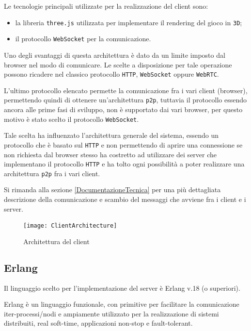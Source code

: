 \documentclass[paper=a4, fontsize=11pt]{scrartcl} %
\numberwithin{equation}{section} %
\numberwithin{figure}{section} %
\numberwithin{table}{section} %
\begin{document}
Le tecnologie principali utilizzate per la realizzazione del client sono:
\begin{itemize}
\item la libreria \texttt{three.js} \cite{threejs} utilizzata per implementare il rendering del gioco in \texttt{3D};
\item il protocollo \texttt{WebSocket} \cite{websocket} per la comunicazione.
\end{itemize}

Uno degli svantaggi di questa architettura è dato da un limite imposto dal browser nel modo di comunicare. Le scelte a disposizione per tale operazione possono ricadere nel classico protocollo \texttt{HTTP}, \texttt{WebSocket} oppure \texttt{WebRTC}.

L'ultimo protocollo elencato permette la comunicazione fra i vari client (browser), permettendo quindi di ottenere un'architettura \texttt{p2p}, tuttavia il
protocollo essendo ancora alle prime fasi di sviluppo, non è supportato dai vari browser, per questo motivo è stato scelto il protocollo \texttt{WebSocket}. 

Tale scelta ha influenzato l'architettura
generale del sistema, essendo un protocollo che è basato sul \texttt{HTTP} e non permettendo di aprire una connessione se non richiesta dal browser stesso ha costretto
ad utilizzare dei server che implementano il protocollo \texttt{HTTP} e ha tolto ogni possibilità a poter realizzare una architettura \texttt{p2p} fra i vari client.

Si rimanda alla sezione \ref{DocumentazioneTecnica} per una più dettagliata descrizione della comunicazione e scambio del messaggi che avviene fra i client e i server.

\begin{figure}
\centering
\texttt{[image: ClientArchitecture]}
\caption{Architettura del client}
\label{ClientArc}
\end{figure}

\subsection{Erlang}
Il linguaggio scelto per l'implementazione del server è Erlang v.18 \cite{erlang} (o superiori).

Erlang è un linguaggio funzionale, con primitive
per facilitare la comunicazione iter-processi/nodi e ampiamente utilizzato per la realizzazione di sistemi distribuiti, real soft-time, applicazioni non-stop e fault-tolerant.
\end{document}
